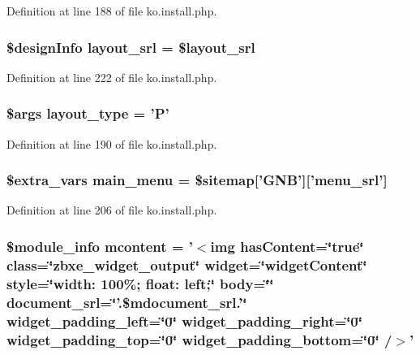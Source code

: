 Definition at line 188 of file ko.\-install.\-php.

\hypertarget{ko_8install_8php_a70054876db09b2519a1726663c8dd9e7}{
\subsubsection[{layout\-\_\-srl}]{\setlength{\rightskip}{0pt plus 5cm}\$design\-Info layout\-\_\-srl = \$layout\-\_\-srl}}\label{ko_8install_8php_a70054876db09b2519a1726663c8dd9e7}


Definition at line 222 of file ko.\-install.\-php.

\hypertarget{ko_8install_8php_a0532d89570cfdaebc628afac2ff5a81b}{
\subsubsection[{layout\-\_\-type}]{\setlength{\rightskip}{0pt plus 5cm}\$args layout\-\_\-type = 'P'}}\label{ko_8install_8php_a0532d89570cfdaebc628afac2ff5a81b}


Definition at line 190 of file ko.\-install.\-php.

\hypertarget{ko_8install_8php_ac71104c770b8ced3891f35849d3f2906}{
\subsubsection[{main\-\_\-menu}]{\setlength{\rightskip}{0pt plus 5cm}\${\bf extra\-\_\-vars} main\-\_\-menu = \$sitemap\mbox{[}'{\bf G\-N\-B}'\mbox{]}\mbox{[}'menu\-\_\-srl'\mbox{]}}}\label{ko_8install_8php_ac71104c770b8ced3891f35849d3f2906}


Definition at line 206 of file ko.\-install.\-php.

\hypertarget{ko_8install_8php_a9da4bb6e77356bb68ae0e05dbd9f5e2f}{
\subsubsection[{mcontent}]{\setlength{\rightskip}{0pt plus 5cm}\$module\-\_\-info {\bf mcontent} = '$<$img has\-Content=\char`\"{}true\char`\"{} class=\char`\"{}zbxe\-\_\-widget\-\_\-output\char`\"{} widget=\char`\"{}widget\-Content\char`\"{} style=\char`\"{}width\-: 100\%; float\-: left;\char`\"{} body=\char`\"{}\char`\"{} document\-\_\-srl=\char`\"{}'.\$mdocument\-\_\-srl.'\char`\"{} widget\-\_\-padding\-\_\-left=\char`\"{}0\char`\"{} widget\-\_\-padding\-\_\-right=\char`\"{}0\char`\"{} widget\-\_\-padding\-\_\-top=\char`\"{}0\char`\"{} widget\-\_\-padding\-\_\-bottom=\char`\"{}0\char`\"{} /$>$'}}\label{ko_8install_8php_a9da4bb6e77356bb68ae0e05dbd9f5e2f}



